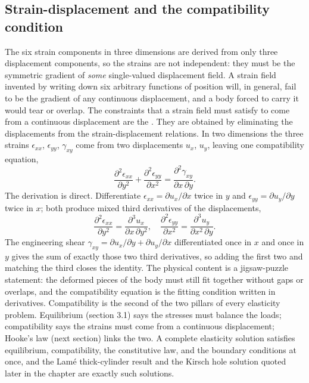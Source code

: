 \subsection{Strain-displacement and the compatibility condition}

The six strain components in three dimensions are derived from only
three displacement components, so the strains are not independent: they
must be the symmetric gradient of \emph{some} single-valued displacement
field. A strain field invented by writing down six arbitrary functions
of position will, in general, fail to be the gradient of any continuous
displacement, and a body forced to carry it would tear or overlap. The
constraints that a strain field must satisfy to come from a continuous
displacement are the . They are
obtained by eliminating the displacements from the strain-displacement
relations. In two dimensions the three strains $\epsilon_{xx}$,
$\epsilon_{yy}$, $\gamma_{xy}$ come from two displacements $u_x$, $u_y$,
leaving one compatibility equation,
\[
\frac{\partial^2 \epsilon_{xx}}{\partial y^2} + \frac{\partial^2
\epsilon_{yy}}{\partial x^2} = \frac{\partial^2 \gamma_{xy}}{\partial x
\,\partial y}.
\]
The derivation is direct. Differentiate $\epsilon_{xx} = \partial u_x/
\partial x$ twice in $y$ and $\epsilon_{yy} = \partial u_y/\partial y$
twice in $x$; both produce mixed third derivatives of the displacements,
\[
\frac{\partial^2 \epsilon_{xx}}{\partial y^2} = \frac{\partial^3 u_x}
{\partial x\,\partial y^2}, \quad \frac{\partial^2 \epsilon_{yy}}
{\partial x^2} = \frac{\partial^3 u_y}{\partial x^2\,\partial y}.
\]
The engineering shear $\gamma_{xy} = \partial u_x/\partial y + \partial
u_y/\partial x$ differentiated once in $x$ and once in $y$ gives the sum
of exactly those two third derivatives, so adding the first two and
matching the third closes the identity. The physical content is a
jigsaw-puzzle statement: the deformed pieces of the body must still fit
together without gaps or overlaps, and the compatibility equation is the
fitting condition written in derivatives. Compatibility is the second of
the two pillars of every elasticity problem. Equilibrium (section 3.1)
says the stresses must balance the loads; compatibility says the strains
must come from a continuous displacement; Hooke's law (next section)
links the two. A complete elasticity solution satisfies equilibrium,
compatibility, the constitutive law, and the boundary conditions at
once, and the Lam\'e thick-cylinder result and the Kirsch hole solution
quoted later in the chapter are exactly such solutions.


